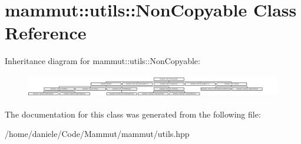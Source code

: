 \hypertarget{classmammut_1_1utils_1_1NonCopyable}{\section{mammut\-:\-:utils\-:\-:Non\-Copyable Class Reference}
\label{classmammut_1_1utils_1_1NonCopyable}
}
Inheritance diagram for mammut\-:\-:utils\-:\-:Non\-Copyable\-:\begin{figure}[H]
\begin{center}
\leavevmode
\includegraphics[height=1.014493cm]{classmammut_1_1utils_1_1NonCopyable}
\end{center}
\end{figure}


The documentation for this class was generated from the following file\-:\begin{DoxyCompactItemize}
\item 
/home/daniele/\-Code/\-Mammut/mammut/utils.\-hpp\end{DoxyCompactItemize}
